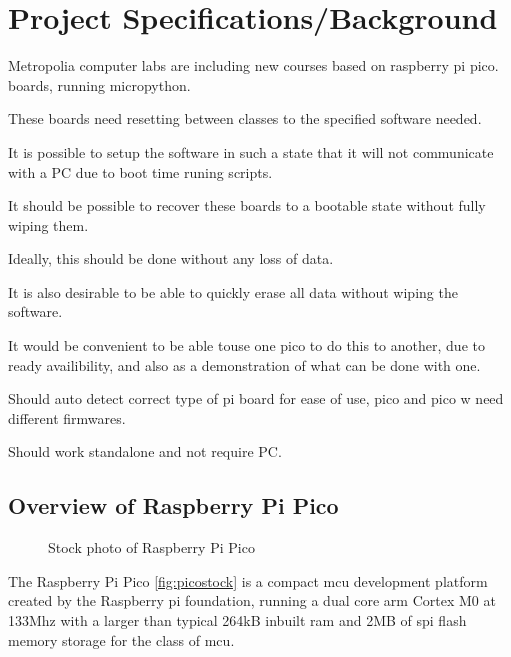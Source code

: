 \clearpage%
\vspace{21.5pt}
\chapter{Project Specifications/Background}

Metropolia computer labs are including new courses based on raspberry pi pico. boards, running micropython.

These boards need resetting between classes to the specified software needed.

It is possible to setup the software in such a state that it will not communicate with a PC due to boot time runing scripts.

It should be possible to recover these boards to a bootable state without fully wiping them.

Ideally, this should be done without any loss of data.

It is also desirable to be able to quickly erase all data without wiping the software.

It would be convenient to be able touse one pico to do this to another, due to ready availibility, and also as a demonstration of what can be done with one.

Should auto detect correct type of pi board for ease of use, pico and pico w need different firmwares.

Should work standalone and not require PC.

\section{Overview of Raspberry Pi Pico}

\begin{figure}[ht]
	\centering
	\caption{Stock photo of Raspberry Pi Pico}
	\label{fig:picostock}
\end{figure}

The Raspberry Pi Pico \autoref{fig:picostock} is a compact \gls{mcu} development platform created by the Raspberry pi foundation, running a dual core \gls{arm} Cortex M0 at 133Mhz with a larger than typical 264kB inbuilt \gls{ram} and 2MB of \gls{spi} flash memory storage for the class of \gls{mcu}\cite{ltdBuyRaspberryPi}.

\pagebreak
